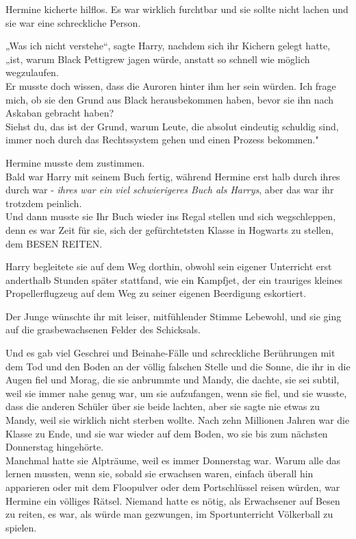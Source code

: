 {Hermine kicherte hilflos. Es war wirklich furchtbar und sie sollte nicht lachen und sie war eine schreckliche Person.

„Was ich nicht verstehe“, sagte Harry, nachdem sich ihr Kichern gelegt hatte, „ist, warum Black Pettigrew jagen würde, anstatt so schnell wie möglich wegzulaufen.\\ Er musste doch wissen, dass die Auroren hinter ihm her sein würden. Ich frage mich, ob sie den Grund aus Black herausbekommen haben, bevor sie ihn nach Askaban gebracht haben?\\ Siehst du, das ist der Grund, warum Leute, die absolut eindeutig schuldig sind, immer noch durch das Rechtssystem gehen und einen Prozess bekommen."

Hermine musste dem zustimmen.\\ Bald war Harry mit seinem Buch fertig, während Hermine erst halb durch ihres durch war - \emph{ihres war ein viel schwierigeres Buch als Harrys}, aber das war ihr trotzdem peinlich.\\ Und dann musste sie Ihr Buch wieder ins Regal stellen und sich wegschleppen, denn es war Zeit für sie, sich der gefürchtetsten Klasse in Hogwarts zu stellen, dem BESEN REITEN.

Harry begleitete sie auf dem Weg dorthin, obwohl sein eigener Unterricht erst anderthalb Stunden später stattfand, wie ein Kampfjet, der ein trauriges kleines Propellerflugzeug auf dem Weg zu seiner eigenen Beerdigung eskortiert.

Der Junge wünschte ihr mit leiser, mitfühlender Stimme Lebewohl, und sie ging auf die grasbewachsenen Felder des Schicksals.

Und es gab viel Geschrei und Beinahe-Fälle und schreckliche Berührungen mit dem Tod und den Boden an der völlig falschen Stelle und die Sonne, die ihr in die Augen fiel und Morag, die sie anbrummte und Mandy, die dachte, sie sei subtil, weil sie immer nahe genug war, um sie aufzufangen, wenn sie fiel, und sie wusste, dass die anderen Schüler über sie beide lachten, aber sie sagte nie etwas zu Mandy, weil sie wirklich nicht sterben wollte. Nach zehn Millionen Jahren war die Klasse zu Ende, und sie war wieder auf dem Boden, wo sie bis zum nächsten Donnerstag hingehörte.\\ Manchmal hatte sie Alpträume, weil es immer Donnerstag war. Warum alle das lernen mussten, wenn sie, sobald sie erwachsen waren, einfach überall hin apparieren oder mit dem Floopulver oder dem Portschlüssel reisen würden, war Hermine ein völliges Rätsel. Niemand hatte es nötig, als Erwachsener auf Besen zu reiten, es war, als würde man gezwungen, im Sportunterricht Völkerball zu spielen.

}
